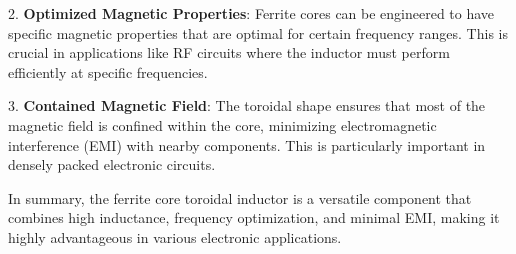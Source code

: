 2. \textbf{Optimized Magnetic Properties}: Ferrite cores can be engineered to have specific magnetic properties that are optimal for certain frequency ranges. This is crucial in applications like RF circuits where the inductor must perform efficiently at specific frequencies.

3. \textbf{Contained Magnetic Field}: The toroidal shape ensures that most of the magnetic field is confined within the core, minimizing electromagnetic interference (EMI) with nearby components. This is particularly important in densely packed electronic circuits.

In summary, the ferrite core toroidal inductor is a versatile component that combines high inductance, frequency optimization, and minimal EMI, making it highly advantageous in various electronic applications.

